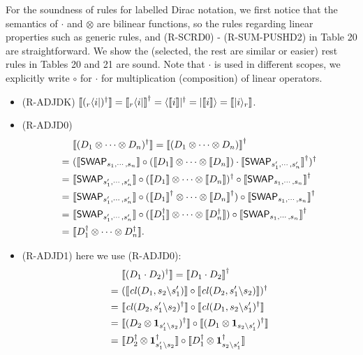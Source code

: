 For the soundness of rules for labelled Dirac notation, we first notice that the semantics of $\cdot$ and $\otimes$ are bilinear functions, so the rules regarding linear properties such as generic rules, and (R-SCRD0) - (R-SUM-PUSHD2) in Table 20 are straightforward. We show the (selected, the rest are similar or easier) rest rules in Tables 20 and 21 are sound. Note that $\cdot$ is used in different scopes, we explicitly write $\circ$ for $\cdot$ for multiplication (composition) of linear operators.
\begin{itemize}
  \item (R-ADJDK) ${\llbracket ({}_r\langle i|)^\dagger \rrbracket} = {\llbracket {}_r\langle i| \rrbracket}^\dagger = \langle{\llbracket i \rrbracket}|^\dagger = |{\llbracket i \rrbracket}\rangle = {\llbracket |i\rangle_r \rrbracket}$.
  \item (R-ADJD0) 
  \begin{align*}
    &{\llbracket (D_1\otimes \cdots \otimes D_n)^\dagger \rrbracket}
    = {\llbracket (D_1\otimes \cdots \otimes D_n) \rrbracket}^\dagger \\
    =\ & ({\llbracket {\mathsf{SWAP}}_{s_1,\cdots,s_n} \rrbracket} \circ ({\llbracket D_1 \rrbracket}\otimes\cdots\otimes{\llbracket D_n \rrbracket}) \cdot {\llbracket {\mathsf{SWAP}}_{s'_1,\cdots,s'_n} \rrbracket}^\dagger)^\dagger  \\ 
    =\ & {\llbracket {\mathsf{SWAP}}_{s'_1,\cdots,s'_n} \rrbracket} \circ ({\llbracket D_1 \rrbracket}\otimes\cdots\otimes{\llbracket D_n \rrbracket})^\dagger \circ {\llbracket {\mathsf{SWAP}}_{s_1,\cdots,s_n} \rrbracket}^\dagger \\ 
    =\ & {\llbracket {\mathsf{SWAP}}_{s'_1,\cdots,s'_n} \rrbracket} \circ ({\llbracket D_1 \rrbracket}^\dagger\otimes\cdots\otimes{\llbracket D_n \rrbracket}^\dagger) \circ {\llbracket {\mathsf{SWAP}}_{s_1,\cdots,s_n} \rrbracket}^\dagger \\ 
    =\ & {\llbracket {\mathsf{SWAP}}_{s'_1,\cdots,s'_n} \rrbracket} \circ ({\llbracket D_1^\dagger \rrbracket}\otimes\cdots\otimes{\llbracket D_n^\dagger \rrbracket}) \circ {\llbracket {\mathsf{SWAP}}_{s_1,\cdots,s_n} \rrbracket}^\dagger \\ 
    =\ & {\llbracket D_1^\dagger\otimes \cdots \otimes D_n^\dagger \rrbracket}.
  \end{align*}
  \item (R-ADJD1) here we use (R-ADJD0): 
  \begin{align*}
    &\sem{(D_1 \cdot D_2)^\dagger}
    = \sem{D_1 \cdot D_2}^\dagger \\
    =\ & (\sem{\cl(D_1,s_2\backslash s_1')} \circ \sem{\cl(D_2,s_1'\backslash s_2)})^\dagger  \\ 
    =\ & \sem{\cl(D_2,s_1'\backslash s_2)^\dagger} \circ \sem{\cl(D_1,s_2\backslash s_1')^\dagger}  \\ 
    =\ & \sem{(D_2 \otimes \mathbf{1}_{s_1'\backslash s_2})^\dagger} \circ \sem{(D_1\otimes \mathbf{1}_{s_2\backslash s_1'})^\dagger}  \\ 
    =\ & \sem{D_2^\dagger \otimes \mathbf{1}_{s_1'\backslash s_2}^\dagger} \circ \sem{D_1^\dagger \otimes \mathbf{1}_{s_2\backslash s_1'}^\dagger} \\ 

\end{align*}
\end{itemize}
